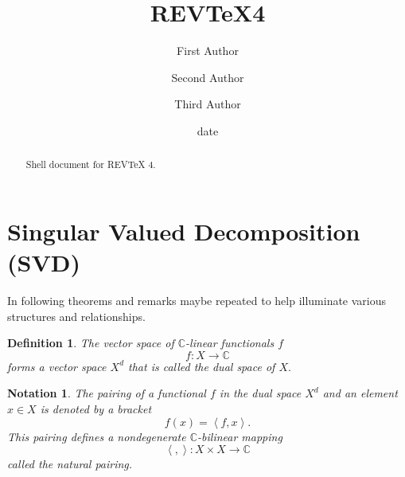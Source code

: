 \documentclass[aps,preprint]{revtex4}%
\newtheorem{definition}[theorem]{Definition}
\newtheorem{notation}[theorem]{Notation}
\begin{document}
\title[Short title for running header]{REV\TeX4}
\author{First Author}
\author{Second Author}
\author{Third Author}

\begin{abstract}
Shell document for REV\TeX{} 4.

\end{abstract}
\date[Date text]{date}




\maketitle
\tableofcontents


\section{Singular Valued Decomposition (SVD)}

In following theorems and remarks maybe repeated to help illuminate various
structures and relationships.

\begin{definition}
The vector space of $\mathbb{C}$-linear functionals $f$%
\begin{equation}
f:X\rightarrow\mathbb{C}%
\end{equation}
forms a vector space $X^{d}$ that is called the \emph{dual space} of $X.$
\end{definition}

\begin{notation}
The pairing of a functional $f$ in the dual space $X^{d}$ and an element $x\in
X$ is denoted by a bracket
\begin{equation}
f\left(  x\right)  =\left\langle f,x\right\rangle .
\end{equation}
This pairing defines a nondegenerate $\mathbb{C}$-bilinear mapping%
\begin{equation}
\left\langle ,\right\rangle :X\times X\rightarrow\mathbb{C}%
\end{equation}
called the natural pairing.
\end{notation}
\end{document}
